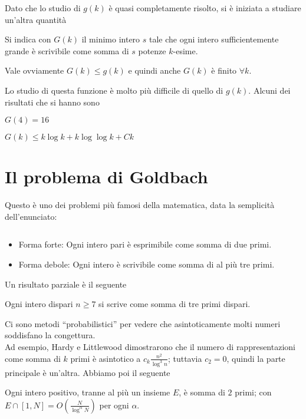 Dato che lo studio di $g(k)$ è quasi completamente risolto, si è iniziata a studiare un'altra quantità
\begin{definition}
    Si indica con $G(k)$ il minimo intero $s$ tale che ogni intero sufficientemente grande è scrivibile come somma di $s$ potenze $k$-esime.
\end{definition}
\begin{oss}
    Vale ovviamente $G(k)\le g(k)$ e quindi anche $G(k)$ è finito $\forall k$.
\end{oss}
Lo studio di questa funzione è molto più difficile di quello di $g(k)$. Alcuni dei risultati che si hanno sono
\begin{theorem}[Davenport, 1939]
    $G(4)=16$
\end{theorem}
\begin{theorem}
    $G(k)\le k\log k+k\log\log k+ Ck$
\end{theorem}


\section{Il problema di Goldbach}
Questo è uno dei problemi più famosi della matematica, data la semplicità dell'enunciato:
\begin{congettura}[Goldbach, 1742]$ $
    \begin{itemize}
        \item Forma forte: Ogni intero pari è esprimibile come somma di due primi.
        \item Forma debole: Ogni intero è scrivibile come somma di al più tre primi.
    \end{itemize}
\end{congettura}

Un risultato parziale è il seguente
\begin{theorem}[Helfgott, 2013]
    Ogni intero dispari $n\ge7$ si scrive come somma di tre primi dispari.
\end{theorem}

Ci sono metodi ``probabilistici'' per vedere che asintoticamente molti numeri soddisfano la congettura.\\
Ad esempio, Hardy e Littlewood dimostrarono che il numero di rappresentazioni come somma di $k$ primi è asintotico a $c_k \frac{n^2}{\log^3n}$; tuttavia $c_2=0$, quindi la parte principale è un'altra.
Abbiamo poi il seguente
\begin{theorem}
    Ogni intero positivo, tranne al più un insieme $E$, è somma di $2$ primi; con $E\cap[1,N]=O\left( \frac{N}{\log^\alpha N} \right)$ per ogni $\alpha$.
\end{theorem}

